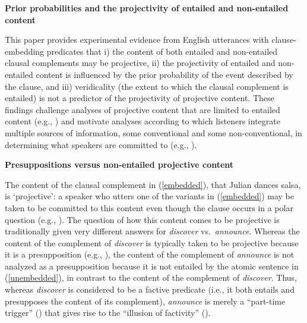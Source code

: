 \documentclass[12pt,fleqn]{article}
\newcommand{\6}{\mbox{$[\hspace*{-.6mm}[$}}
\newcommand{\9}{\mbox{$]\hspace*{-.6mm}]$}}
\begin{document}
 
 
\begin{center}
{\large \bf Prior probabilities and the projectivity of entailed and non-entailed content}
\end{center}

This paper provides experimental evidence from English utterances with clause-embedding predicates that i) the content of both entailed and non-entailed clausal complements may be projective, ii) the projectivity of entailed and non-entailed content is influenced by the prior probability of the event described by the clause, and iii) veridicality (the extent to which the clausal complement is entailed) is not a predictor of the projectivity of projective content. These findings challenge analyses of projective content that are limited to entailed content (e.g., \citealt{heim83,vds92}) and motivate analyses according to which listeners integrate multiple sources of information, some conventional and some non-conventional, in determining what speakers are committed to (e.g., \citealt{brst-salt10,brst-ar,abrusan2011,abrusan2013,tbd-variability}). 

{\bf Presuppositions versus non-entailed projective content} 

The content of the clausal complement in (\ref{embedded}), that Julian dances salsa, is `projective': a speaker who utters one of the variants in (\ref{embedded}) may be taken to be committed to this content even though the clause occurs in a polar question (e.g., \citealt{ccmg90}). The question of how this content comes to be projective is traditionally given very different answers for {\em discover} vs.\ {\em announce}. Whereas the content of the complement of {\em discover} is typically taken to be projective because it is a presupposition (e.g., \citealt{heim83,vds92}), the content of the complement of {\em announce} is not analyzed as a presupposition because it is not entailed by the atomic sentence in (\ref{unembedded}), in contrast to the content of the complement of {\em discover}. Thus, whereas {\em discover} is considered to be a factive predicate (i.e., it both entails and presupposes the content of its complement), {\em announce} is merely a ``part-time trigger'' (\citealt[139]{schlenker10}) that gives rise to the ``illusion of factivity'' (\citealt[76]{anand-hacquard2014}).
\end{document}
